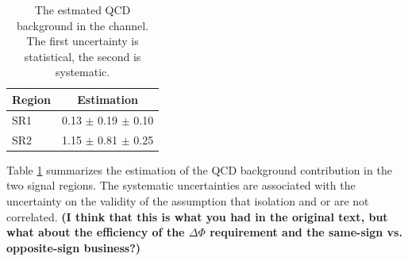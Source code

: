 

\begin{table}[!Hhtb]
\begin{center}
\begin{tabular}{|l|c|}
\hline\hline
 Region      &  Estimation\\
\hline\hline
SR1      & 0.13 $\pm$ 0.19 $\pm$ 0.10 \\
\hline
SR2      & 1.15 $\pm$ 0.81 $\pm$ 0.25  \\
\hline\hline
\end{tabular}
\caption{The estmated QCD background in the \tauTau channel. The first uncertainty is statistical, the second is systematic. }
\label{4QCDbg}
\end{center}
\end{table}

Table \ref{4QCDbg} 
summarizes the estimation of the QCD background contribution in the two signal regions.  The systematic uncertainties are associated with the uncertainty
on the validity 
of the assumption that isolation and \mttwo or \SumMT are not correlated.
{\bf (I think that this is what you had in the original text,
but what about the efficiency of the $\Delta \Phi$ requirement and the 
same-sign vs. opposite-sign business?)}


